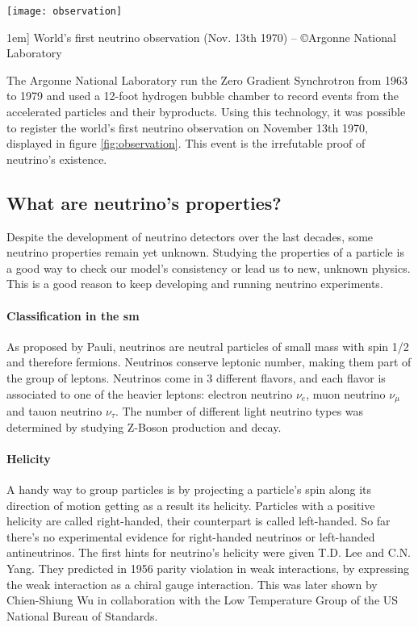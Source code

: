 \begin{figure*}
  \centering
  \texttt{[image: observation]}
  \caption[][1em]{%
      World's first neutrino observation (Nov. 13th 1970)
      -- \copyright Argonne National Laboratory
  }
  \label{fig:observation}
\end{figure*}

The Argonne National Laboratory run the Zero Gradient Synchrotron from 1963 to 1979 and used a 12-foot hydrogen bubble chamber to record events from the accelerated particles and their byproducts.
Using this technology, it was possible to register the world's first neutrino observation on November 13th 1970, displayed in figure \ref{fig:observation}.
This event is the irrefutable proof of neutrino's existence.


\subsection{What are neutrino's properties?}
Despite the development of neutrino detectors over the last decades, some neutrino properties remain yet unknown.
Studying the properties of a particle is a good way to check our model's consistency or lead us to new, unknown physics.
This is a good reason to keep developing and running neutrino experiments.

\paragraph{Classification in the \gls{sm}} As proposed by Pauli, neutrinos are neutral particles of small mass with spin 1/2 and therefore fermions.
Neutrinos conserve leptonic number, making them part of the group of leptons.
Neutrinos come in 3 different flavors, and each flavor is associated to one of the heavier leptons: electron neutrino $\nu_e$, muon neutrino $\nu_\mu$ and tauon neutrino $\nu_\tau$.
The number of different light neutrino types was determined by studying Z-Boson production and decay\cite{Karlen:2004fj}.

\paragraph{Helicity} A handy way to group particles is by projecting a particle's spin along its direction of motion getting as a result its helicity.
Particles with a positive helicity are called right-handed, their counterpart is called left-handed.
So far there's no experimental evidence for right-handed neutrinos or left-handed antineutrinos\cite{1601.00627}\cite{Romero:2016str}.
The first hints for neutrino's helicity were given T.D. Lee and C.N. Yang.
They predicted in 1956 parity violation in weak interactions, by expressing the weak interaction as a chiral gauge interaction.
This was later shown by Chien-Shiung Wu in collaboration with the Low Temperature Group of the US National Bureau of Standards\cite{PhysRev.105.1413}.

